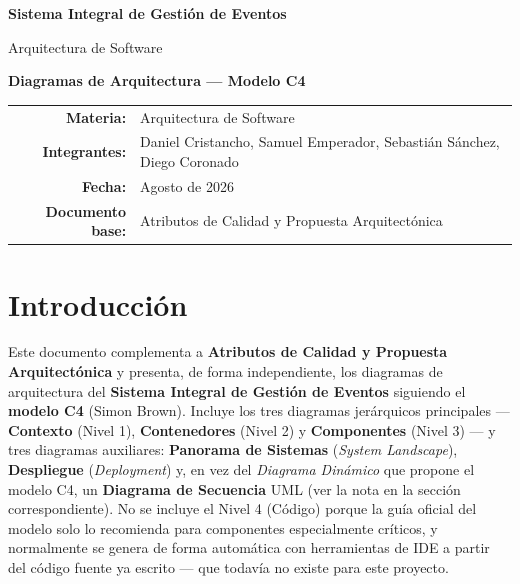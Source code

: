 \documentclass[12pt,a4paper]{article}
\begin{document}
\begin{titlepage}
\centering
\vspace*{2cm}
{\Huge\bfseries Sistema Integral de Gestión de Eventos\par}
\vspace{0.7cm}
{\Large Arquitectura de Software\par}
\vspace{1.2cm}
{\Large\bfseries Diagramas de Arquitectura --- Modelo C4\par}
\vspace{2cm}
\vfill
\begin{tabular}{rl}
\textbf{Materia:} & Arquitectura de Software\\
\textbf{Integrantes:} & Daniel Cristancho, Samuel Emperador, Sebastián Sánchez, Diego Coronado\\
\textbf{Fecha:} & Agosto de 2026\\
\textbf{Documento base:} & Atributos de Calidad y Propuesta Arquitectónica
\end{tabular}
\end{titlepage}

\tableofcontents
\newpage

\section{Introducción}

Este documento complementa a \textbf{Atributos de Calidad y Propuesta Arquitectónica} y presenta,
de forma independiente, los diagramas de arquitectura del \textbf{Sistema Integral de Gestión de
Eventos} siguiendo el \textbf{modelo C4} (Simon Brown). Incluye los tres diagramas jerárquicos
principales --- \textbf{Contexto} (Nivel 1), \textbf{Contenedores} (Nivel 2) y \textbf{Componentes}
(Nivel 3) --- y tres diagramas auxiliares: \textbf{Panorama de Sistemas} (\textit{System
Landscape}), \textbf{Despliegue} (\textit{Deployment}) y, en vez del \textit{Diagrama Dinámico} que
propone el modelo C4, un \textbf{Diagrama de Secuencia} UML (ver la nota en la sección
correspondiente). No se
incluye el Nivel 4 (Código) porque la guía oficial del modelo solo lo recomienda para componentes
especialmente críticos, y normalmente se genera de forma automática con herramientas de IDE a
partir del código fuente ya escrito --- que todavía no existe para este proyecto.
\end{document}
